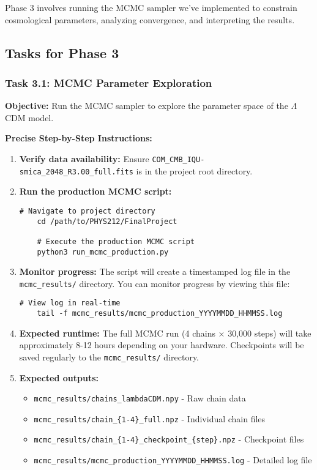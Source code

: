 \documentclass[11pt]{article}
\begin{document}
Phase 3 involves running the MCMC sampler we've implemented to constrain cosmological parameters, analyzing convergence, and interpreting the results.

\subsection{Tasks for Phase 3}

\subsubsection{Task 3.1: MCMC Parameter Exploration}

\textbf{Objective:} Run the MCMC sampler to explore the parameter space of the $\Lambda$CDM model.

\textbf{Precise Step-by-Step Instructions:}

\begin{enumerate}
    \item \textbf{Verify data availability:} Ensure \texttt{COM\_CMB\_IQU-smica\_2048\_R3.00\_full.fits} is in the project root directory.
    
    \item \textbf{Run the production MCMC script:}
    \begin{lstlisting}[basicstyle=\small\ttfamily]
    # Navigate to project directory
    cd /path/to/PHYS212/FinalProject
    
    # Execute the production MCMC script
    python3 run_mcmc_production.py
    \end{lstlisting}
    
    \item \textbf{Monitor progress:} The script will create a timestamped log file in the \texttt{mcmc\_results/} directory. You can monitor progress by viewing this file:
    \begin{lstlisting}[basicstyle=\small\ttfamily]
    # View log in real-time
    tail -f mcmc_results/mcmc_production_YYYYMMDD_HHMMSS.log
    \end{lstlisting}
    
    \item \textbf{Expected runtime:} The full MCMC run (4 chains × 30,000 steps) will take approximately 8-12 hours depending on your hardware. Checkpoints will be saved regularly to the \texttt{mcmc\_results/} directory.
    
    \item \textbf{Expected outputs:}
    \begin{itemize}
        \item \texttt{mcmc\_results/chains\_lambdaCDM.npy} - Raw chain data
        \item \texttt{mcmc\_results/chain\_\{1-4\}\_full.npz} - Individual chain files
        \item \texttt{mcmc\_results/chain\_\{1-4\}\_checkpoint\_\{step\}.npz} - Checkpoint files
        \item \texttt{mcmc\_results/mcmc\_production\_YYYYMMDD\_HHMMSS.log} - Detailed log file
    \end{itemize}
\end{enumerate}
\end{document}
